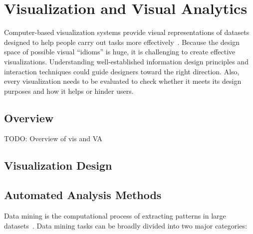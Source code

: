 \section{Visualization and Visual Analytics}
Computer-based visualization systems provide visual representations of datasets designed to help people carry out tasks more effectively~\cite{Munzner2014}. Because the design space of possible visual ``idioms'' is huge, it is challenging to create effective visualizations. Understanding well-established information design principles and interaction techniques could guide designers toward the right direction. Also, every visualization needs to be evaluated to check whether it meets its design purposes and how it helps or hinder users.

\subsection{Overview}
TODO: Overview of vis and VA

%
%
%
%
%

\subsection{Visualization Design}


\subsection{Automated Analysis Methods}
Data mining is the computational process of extracting patterns in large datasets~\cite{Tan2006}. Data mining tasks can be broadly divided into two major categories:

